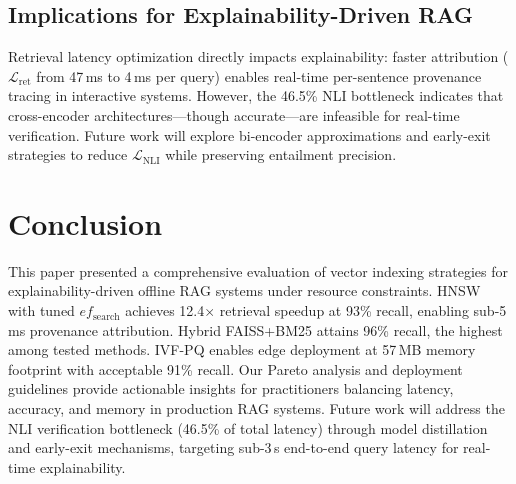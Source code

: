 \documentclass[conference]{IEEEtran}
\begin{document}
\subsection{Implications for Explainability-Driven RAG}

Retrieval latency optimization directly impacts explainability: faster attribution ($\mathcal{L}_{\mathrm{ret}}$ from 47\,ms to 4\,ms per query) enables real-time per-sentence provenance tracing in interactive systems. However, the 46.5\% NLI bottleneck indicates that cross-encoder architectures—though accurate—are infeasible for real-time verification. Future work will explore bi-encoder approximations and early-exit strategies to reduce $\mathcal{L}_{\mathrm{NLI}}$ while preserving entailment precision.

\section{Conclusion}

This paper presented a comprehensive evaluation of vector indexing strategies for explainability-driven offline RAG systems under resource constraints. HNSW with tuned $ef_{\mathrm{search}}$ achieves 12.4$\times$ retrieval speedup at 93\% recall, enabling sub-5\,ms provenance attribution. Hybrid FAISS+BM25 attains 96\% recall, the highest among tested methods. IVF-PQ enables edge deployment at 57\,MB memory footprint with acceptable 91\% recall. Our Pareto analysis and deployment guidelines provide actionable insights for practitioners balancing latency, accuracy, and memory in production RAG systems. Future work will address the NLI verification bottleneck (46.5\% of total latency) through model distillation and early-exit mechanisms, targeting sub-3\,s end-to-end query latency for real-time explainability.
\end{document}
